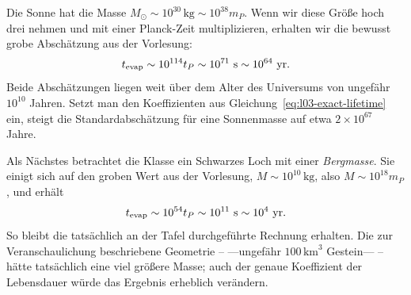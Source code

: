 Die Sonne hat die Masse \(M_\odot\sim10^{30}\,\mathrm{kg}\sim10^{38}m_P\). Wenn wir diese Größe hoch drei nehmen und mit einer Planck-Zeit multiplizieren, erhalten wir die bewusst grobe Abschätzung aus der Vorlesung:
\begin{equation}
t_{\mathrm{evap}}\sim10^{114}t_P
\sim10^{71}\ {\rm s}
\sim10^{64}\ {\rm yr}.
\end{equation}
Beide Abschätzungen liegen weit über dem Alter des Universums von ungefähr \(10^{10}\) Jahren. Setzt man den Koeffizienten aus Gleichung~\eqref{eq:l03-exact-lifetime} ein, steigt die Standardabschätzung für eine Sonnenmasse auf etwa \(2\times10^{67}\) Jahre.

Als Nächstes betrachtet die Klasse ein Schwarzes Loch mit einer \emph{Bergmasse}. Sie einigt sich auf den groben Wert aus der Vorlesung, \(M\sim10^{10}\,\mathrm{kg}\), also \(M\sim10^{18}m_P\), und erhält
\begin{equation}
t_{\mathrm{evap}}\sim10^{54}t_P
\sim10^{11}\ {\rm s}
\sim10^4\ {\rm yr}.
\end{equation}
So bleibt die tatsächlich an der Tafel durchgeführte Rechnung erhalten. Die zur Veranschaulichung beschriebene Geometrie – ---ungefähr \(100\,\mathrm{km}^3\) Gestein--- – hätte tatsächlich eine viel größere Masse; auch der genaue Koeffizient der Lebensdauer würde das Ergebnis erheblich verändern.

\begin{classroomqa}
\end{classroomqa}

